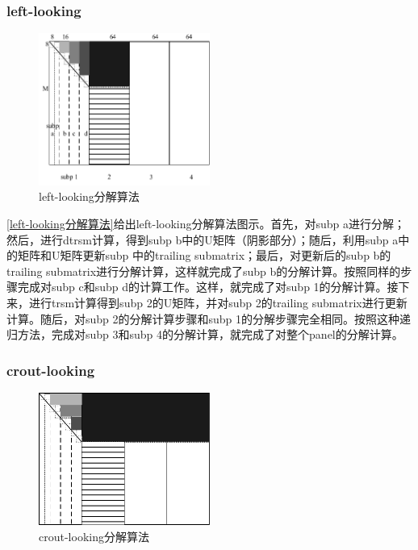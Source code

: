     \subsubsection{left-looking}

    \begin{figure}
        \centering
        \includegraphics[width=0.5\textwidth]{image/chap02/left-looking}
        \caption{left-looking分解算法}
        \label{left-looking分解算法}
    \end{figure}

    \autoref{left-looking分解算法}给出left-looking分解算法图示。首先，对subp a进行分解；然后，进行dtrsm计算，得到subp b中的U矩阵（阴影部分）；随后，利用subp a中的矩阵和U矩阵更新subp 中的trailing submatrix；最后，对更新后的subp b的trailing submatrix进行分解计算，这样就完成了subp b的分解计算。按照同样的步骤完成对subp c和subp d的计算工作。这样，就完成了对subp 1的分解计算。接下来，进行trsm计算得到subp 2的U矩阵，并对subp 2的trailing submatrix进行更新计算。随后，对subp 2的分解计算步骤和subp 1的分解步骤完全相同。按照这种递归方法，完成对subp 3和subp 4的分解计算，就完成了对整个panel的分解计算。

    \subsubsection{crout-looking}

    \begin{figure}
        \centering
        \includegraphics[width=0.5\textwidth]{image/chap02/crout-looking}
        \caption{crout-looking分解算法}
        \label{crout-looking分解算法}
    \end{figure}

